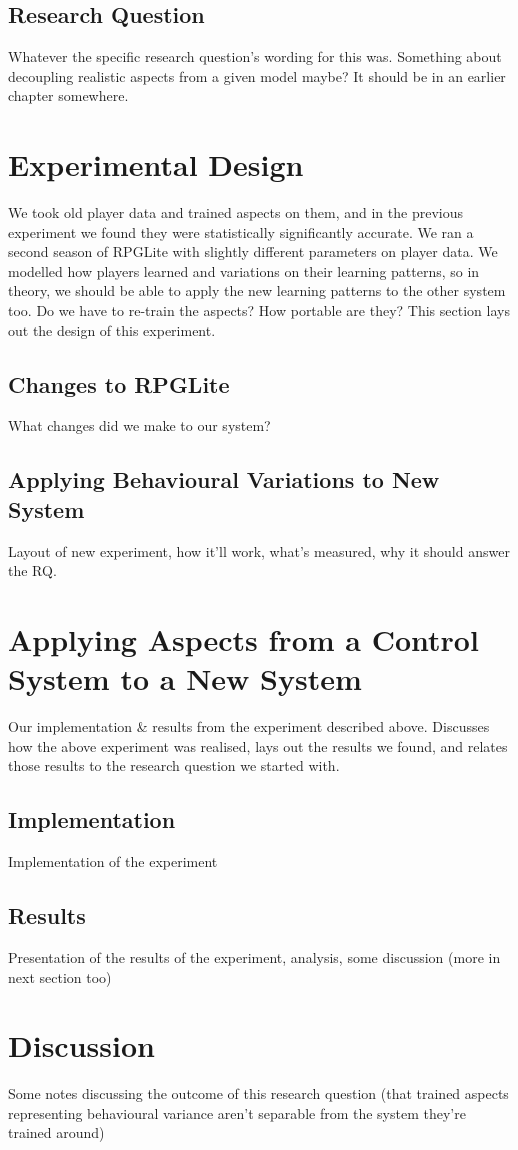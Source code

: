 \subsection{Research Question}
Whatever the specific research question's wording for this was. Something about
decoupling realistic aspects from a given model maybe? It should be in an
earlier chapter somewhere.

\section{Experimental Design}
We took old player data and trained aspects on them, and in the previous
experiment we found they were statistically significantly accurate. We ran a
second season of RPGLite with slightly different parameters on player data. We
modelled how players learned and variations on their learning patterns, so in
theory, we should be able to apply the new learning patterns to the other system
too. Do we have to re-train the aspects? How portable are they? This section
lays out the design of this experiment.


\subsection{Changes to RPGLite}
What changes did we make to our system?


\subsection{Applying Behavioural Variations to New System}
Layout of new experiment, how it'll work, what's measured, why it should answer
the RQ.


\section{Applying Aspects from a Control System to a New System}
Our implementation & results from the experiment described above. Discusses how
the above experiment was realised, lays out the results we found, and relates
those results to the research question we started with.

\subsection{Implementation}
Implementation of the experiment

\subsection{Results}
Presentation of the results of the experiment, analysis, some discussion (more
in next section too)

\section{Discussion}
Some notes discussing the outcome of this research question (that trained
aspects representing behavioural variance aren't separable from the system
they're trained around)

